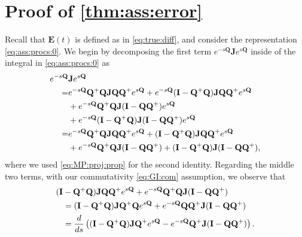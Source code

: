 \documentclass[9pt,twocolumn,twoside]{pnas-new}
\newcommand{\?}{\textbf{?}}
\newcommand{\QQ}{\mathbf{Q}}
\newcommand{\JJ}{\mathbf{J}}
\newcommand{\II}{\mathbf{I}}
\newcommand{\Z}{\mathbf{E}}
\begin{document}
\showacknow{} %









\newpage



\appendix  


\section{Proof of \cref{thm:ass:error}}
\label{sec:Thm:det:main}


Recall that $\Z(t)$ is defined as in \eqref{eq:true:diff}, and
consider the representation \eqref{eq:ass:procs:0}. We begin by
decomposing the first term $e^{-s\QQ} \JJ e^{s \QQ}$ inside of the
integral in \eqref{eq:ass:procs:0} as
\begin{align}
  e^{-s\QQ} &\JJ e^{s \QQ} \notag\\
  =&e^{-s\QQ} \QQ^+ \QQ \JJ \QQ \QQ^{+} e^{s\QQ}
     + e^{-s\QQ} (\II -\QQ^+ \QQ) \JJ \QQ \QQ^{+} e^{s\QQ}
                  \notag\\
      &+ e^{-s\QQ}\QQ^+ \QQ \JJ (\II - \QQ \QQ^{+}) e^{s\QQ}
                \notag\\
       &+e^{-s\QQ} (\II -\QQ^+ \QQ) \JJ (\II -\QQ \QQ^{+}) e^{s\QQ}
                           \notag\\
  = &e^{-s\QQ} \QQ^+ \QQ \JJ \QQ \QQ^{+} e^{s\QQ}
      + (\II -\QQ^+ \QQ) \JJ \QQ \QQ^{+} e^{s\QQ}
         \label{eq:big:yuck:1}                          
      \\
      &+ e^{-s\QQ}\QQ^+ \QQ \JJ (\II - \QQ \QQ^{+})
  + (\II -\QQ^+ \QQ) \JJ (\II -\QQ \QQ^{+}),
  \notag
\end{align}
where we used \eqref{eq:MP:proj:prop} for the second identity.
Regarding the middle two terms, with our commutativity
\eqref{eq:GI:com} assumption, we observe that
\begin{align}
  (\II &-\QQ^+ \QQ) \JJ \QQ \QQ^{+} e^{s\QQ}
         + e^{-s\QQ}\QQ^+ \QQ \JJ (\II - \QQ \QQ^{+})
                \label{eq:big:yuck:2}                          
                     \\
  &=  (\II -\QQ^+ \QQ) \JJ \QQ^{+} \QQ e^{s\QQ}
    + e^{-s\QQ}\QQ \QQ^+ \JJ (\II - \QQ \QQ^{+})
    \notag\\
  &= \frac{d}{ds}
    \left(
    (\II -\QQ^+ \QQ) \JJ \QQ^{+} e^{s\QQ}
    - e^{-s\QQ} \QQ^+ \JJ (\II - \QQ \QQ^{+})
    \right).
 \notag
\end{align}
\end{document}

